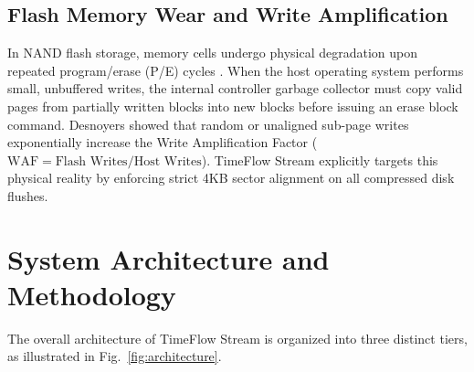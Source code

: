 \documentclass[journal]{IEEEtran}
\begin{document}
\subsection{Flash Memory Wear and Write Amplification}
In NAND flash storage, memory cells undergo physical degradation upon repeated program/erase (P/E) cycles \cite{colavito2021write}. When the host operating system performs small, unbuffered writes, the internal controller garbage collector must copy valid pages from partially written blocks into new blocks before issuing an erase block command. Desnoyers \cite{colavito2021write} showed that random or unaligned sub-page writes exponentially increase the Write Amplification Factor ($\text{WAF} = \text{Flash Writes} / \text{Host Writes}$). TimeFlow Stream explicitly targets this physical reality by enforcing strict 4KB sector alignment on all compressed disk flushes.

\section{System Architecture and Methodology}

The overall architecture of TimeFlow Stream is organized into three distinct tiers, as illustrated in Fig.~\ref{fig:architecture}.
\end{document}
